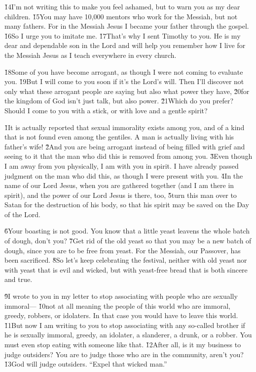 \v{14}I'm not writing this to make you feel ashamed, but to warn you as my dear children. \v{15}You may have 10,000 mentors who work for the Messiah, but not many fathers. For in the Messiah Jesus I became your father through the gospel. \v{16}So I urge you to imitate me. \v{17}That's why I sent Timothy to you. He is my dear and dependable son in the Lord and will help you remember how I live for the Messiah Jesus as I teach everywhere in every church.

\v{18}Some of you have become arrogant, as though I were not coming to evaluate you. \v{19}But I will come to you soon if it's the Lord's will. Then I'll discover not only what these arrogant people are saying but also what power they have, \v{20}for the kingdom of God isn't just talk, but also power. \v{21}Which do you prefer? Should I come to you with a stick, or with love and a gentle spirit?

\v{1}It is actually reported that sexual immorality exists among you, and of a kind that is not found even among the gentiles. A man is actually living with his father's wife! \v{2}And you are being arrogant instead of being filled with grief and seeing to it that the man who did this is removed from among you. \v{3}Even though I am away from you physically, I am with you in spirit. I have already passed judgment on the man who did this, as though I were present with you. \v{4}In the name of our Lord Jesus, when you are gathered together (and I am there in spirit), and the power of our Lord Jesus is there, too, \v{5}turn this man over to Satan for the destruction of his body, so that his spirit may be saved on the Day of the Lord.

\v{6}Your boasting is not good. You know that a little yeast leavens the whole batch of dough, don't you? \v{7}Get rid of the old yeast so that you may be a new batch of dough, since you are to be free from yeast. For the Messiah, our Passover, has been sacrificed. \v{8}So let's keep celebrating the festival, neither with old yeast nor with yeast that is evil and wicked, but with yeast-free bread that is both sincere and true.

\v{9}I wrote to you in my letter to stop associating with people who are sexually immoral--- \v{10}not at all meaning the people of this world who are immoral, greedy, robbers, or idolaters. In that case you would have to leave this world. \v{11}But now I am writing to you to stop associating with any so-called brother if he is sexually immoral, greedy, an idolater, a slanderer, a drunk, or a robber. You must even stop eating with someone like that. \v{12}After all, is it my business to judge outsiders? You are to judge those who are in the community, aren't you? \v{13}God will judge outsiders. ``Expel that wicked man.''

